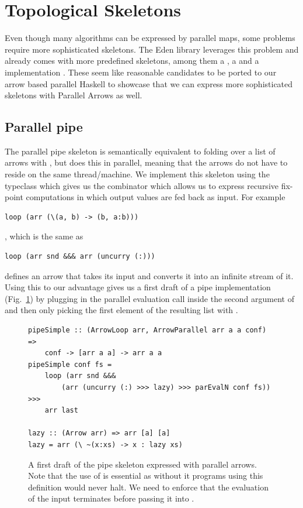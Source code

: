 \FloatBarrier
\section{Topological Skeletons}
\label{sec:topology-skeletons}
Even though many algorithms can be expressed by parallel maps, some problems require more sophisticated skeletons. The Eden library leverages this problem and already comes with more predefined skeletons, among them a , a  and a  implementation \cite{Loogen2012, eden_skel_topology}. These seem like reasonable candidates to be ported to our arrow based parallel Haskell to showcase that we can express more sophisticated skeletons with Parallel Arrows as well.

\subsection{Parallel pipe}

The parallel pipe skeleton is semantically equivalent to folding over a list \code{[arr a a]} of arrows with \code{>>>}, but does this in parallel, meaning that the arrows do not have to reside on the same thread/machine. We implement this skeleton using the  typeclass which gives us the  combinator which allows us to express recursive fix-point computations in which output values are fed back as input. For example %
\begin{lstlisting}[frame=htrbl]
loop (arr (\(a, b) -> (b, a:b)))
\end{lstlisting}
, which is the same as
\begin{lstlisting}[frame=htrbl]
loop (arr snd &&& arr (uncurry (:)))
\end{lstlisting}
defines an arrow that takes its input  and converts it into an infinite stream \code{[a]} of it. Using this to our advantage gives us a first draft of a pipe implementation (Fig.~\ref{fig:pipeSimple}) by plugging in the parallel evaluation call  inside the second argument of \code{(\&\&\&)} and then only picking the first element of the resulting list with .
\begin{figure}[h]
\begin{lstlisting}[frame=htrbl]
pipeSimple :: (ArrowLoop arr, ArrowParallel arr a a conf) =>
	conf -> [arr a a] -> arr a a
pipeSimple conf fs =
	loop (arr snd &&&
		(arr (uncurry (:) >>> lazy) >>> parEvalN conf fs)) >>>
	arr last

lazy :: (Arrow arr) => arr [a] [a]
lazy = arr (\ ~(x:xs) -> x : lazy xs)
\end{lstlisting}
\caption{A first draft of the pipe skeleton expressed with parallel arrows. Note that the use of  is essential as without it programs using this definition would never halt. We need to enforce that the evaluation of the input \code{[a]} terminates before passing it into .}
\label{fig:pipeSimple}
\end{figure}

